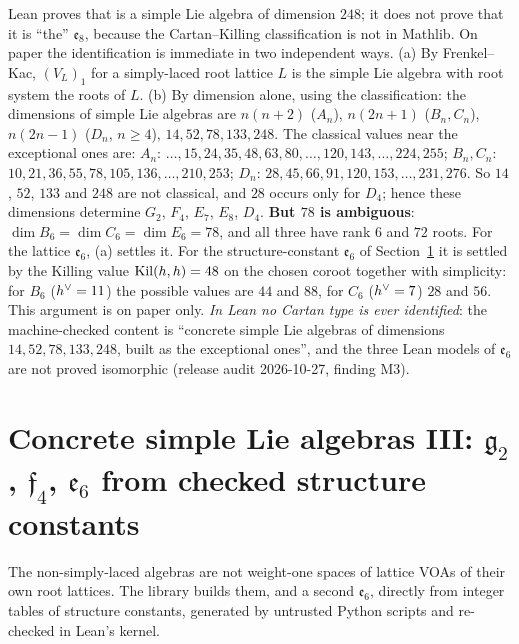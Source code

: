 \begin{remark}\label{l23:rem:type}
Lean proves that  is a simple Lie algebra of dimension $248$; it does not prove that it is ``the'' $\mathfrak e_8$, because
the Cartan--Killing classification is not in Mathlib. On paper the identification is immediate in two independent ways. (a) By
Frenkel--Kac, $(V_L)_1$ for a simply-laced root lattice $L$ is the simple Lie algebra with root system the roots of $L$. (b) By
dimension alone, using the classification: the dimensions of simple Lie algebras are $n(n+2)$ ($A_n$), $n(2n+1)$ ($B_n,C_n$),
$n(2n-1)$ ($D_n$, $n\ge4$), $14,52,78,133,248$. The classical values near the exceptional ones are: $A_n$: $\dots,15,24,35,48,63,80,\dots,
120,143,\dots,224,255$; $B_n,C_n$: $10,21,36,55,78,105,136,\dots,210,253$; $D_n$: $28,45,66,91,120,153,\dots,231,276$. So $14$, $52$,
$133$ and $248$ are not classical, and $28$ occurs only for $D_4$; hence these dimensions determine $G_2$, $F_4$, $E_7$, $E_8$, $D_4$.
\textbf{But $78$ is ambiguous}: $\dim B_6=\dim C_6=\dim E_6=78$, and all three have rank $6$ and $72$ roots. For the lattice $\mathfrak e_6$,
(a) settles it. For the structure-constant $\mathfrak e_6$ of Section~\ref{l23:sec:sc} it is settled by the Killing value
$\operatorname{Kil}(h,h)=48$ on the chosen coroot together with simplicity: for $B_6$ ($h^\vee=11$) the possible values are $44$ and $88$, for
$C_6$ ($h^\vee=7$) $28$ and $56$. This argument is on paper only. \emph{In Lean no Cartan type is ever identified}: the machine-checked
content is ``concrete simple Lie algebras of dimensions $14,52,78,133,248$, built as the exceptional ones'', and the three Lean models of
$\mathfrak e_6$ are not proved isomorphic (release audit 2026-10-27, finding M3).
\end{remark}

\section{Concrete simple Lie algebras III: \texorpdfstring{$\mathfrak g_2$, $\mathfrak f_4$, $\mathfrak e_6$}{g2, f4, e6} from checked structure constants}\label{l23:sec:sc}

The non-simply-laced algebras are not weight-one spaces of lattice VOAs of their own root lattices. The library builds them, and a
second $\mathfrak e_6$, directly from integer tables of structure constants, generated by untrusted Python scripts and re-checked in
Lean's kernel.

